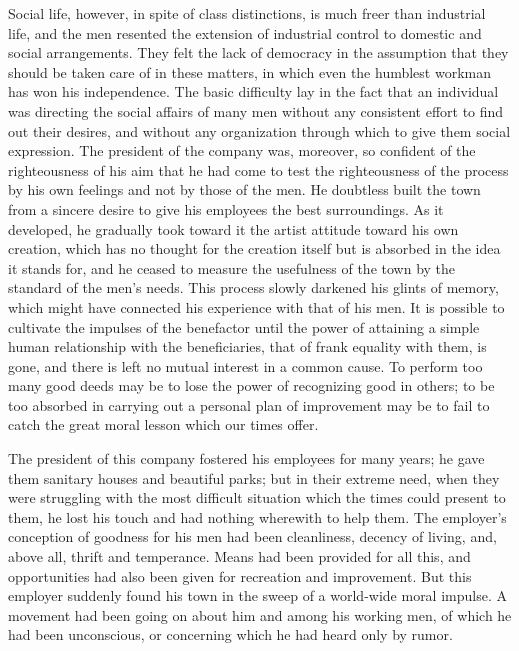 \documentclass[]{article}
\begin{document}
\begin{sectionbody}
\addamsparagraph Social life, however, in spite of class distinctions, is much freer than
industrial life, and the men resented the extension of industrial
control to domestic and social arrangements. They felt the lack of
democracy in the assumption that they should be taken care of in these
matters, in which even the humblest workman has won his independence.
The basic difficulty lay in the fact that an individual was directing
the social affairs of many men without any consistent effort to find out
their desires, and without any organization through which to give them
social expression. The president of the company was, moreover, so
confident of the righteousness of his aim that he had come to test the
righteousness of the process by his own feelings and not by those of the
men. He doubtless built the town from a sincere desire to give his
employees the best surroundings. As it developed, he gradually took
toward it the artist attitude toward his own creation, which has no
thought for the creation itself but is absorbed in the idea it stands
for, and he ceased to measure the usefulness of the town by the standard
of the men's needs. This process slowly darkened his glints of memory,
which might have connected his experience with that of his men. It is
possible to cultivate the impulses of the benefactor until the power of
attaining a simple human relationship with the beneficiaries, that of
frank equality with them, is gone, and there is left no mutual interest
in a common cause. To perform too many good deeds may be to lose the
power of recognizing good in others; to be too absorbed in carrying out
a personal plan of improvement may be to fail to catch the great moral
lesson which our times offer.

\addamsparagraph The president of this company fostered his employees for many years; he
gave them sanitary houses and beautiful parks; but in their extreme
need, when they were struggling with the most difficult situation which
the times could present to them, he lost his touch and had nothing
wherewith to help them. The employer's conception of goodness for his
men had been cleanliness, decency of living, and, above all, thrift and
temperance. Means had been provided for all this, and opportunities had
also been given for recreation and improvement. But this employer
suddenly found his town in the sweep of a world-wide moral impulse. A
movement had been going on about him and among his working men, of which
he had been unconscious, or concerning which he had heard only by rumor.


\end{sectionbody}
\end{document}
